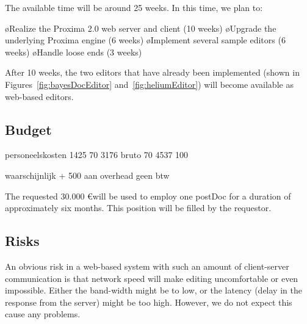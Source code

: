 \documentclass[10pt]{article}
\begin{document}
The available time will be around 25 weeks. In this time, we plan to:

\bl
\o Realize the Proxima 2.0 web server and client (10 weeks)
\o Upgrade the underlying Proxima engine (6 weeks)
\o Implement several sample editors (6 weeks)
\o Handle loose ends (3 weeks) 
\el

After 10 weeks, the two editors that have already been implemented (shown in Figures~\ref{fig:bayesDocEditor} and~\ref{fig:heliumEditor}) will become available as web-based editors.


\subsection{Budget}

\bc
personeelskosten
1425       70%
3176 bruto 70%
4537       100%

waarschijnlijk + 500 aan overhead
geen btw
\ec

The requested 30.000 \euro will be used to employ one postDoc for a duration of approximately six months. This position will be filled by the requestor.

\subsection{Risks}


An obvious risk in a web-based system with such an amount of client-server communication is that network speed will make editing uncomfortable or even impossible. Either the band-width might be to low, or the latency (delay in the response from the server) might be too high. However, we do not expect this cause any problems.
\end{document}
